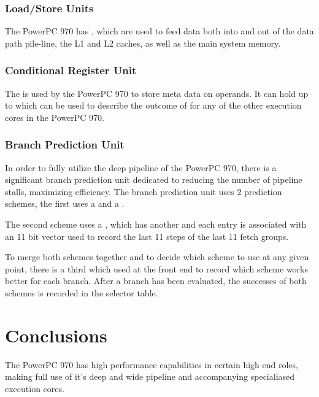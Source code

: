 \documentclass[a4paper,12pt]{article}
\begin{document}
\subsubsection{Load/Store Units}

The PowerPC 970 has \cite[dual load/store units for the entire CPU]{a1}, 
which are used to feed data both into and out of the data path pile-line, the L1 and 
L2 caches, as well as the main system memory.

\subsubsection{Conditional Register Unit}

The \cite[32 bit conditional register unit]{a6} is used by the PowerPC
970 to store meta data on \cite[integer and floating point]{a6} operands.
It can hold up to \cite[8 condition codes]{a6} which can be used to
describe the outcome of \cite[8 different instructions]{a6} for any of
the other execution cores in the PowerPC 970.

\subsubsection{Branch Prediction Unit}

In order to fully utilize the deep pipeline of the PowerPC 970, there is
a significant branch prediction unit dedicated to reducing the number of
pipeline stalls, maximizing efficiency. The branch prediction unit uses
2 prediction schemes, the first uses a \cite[16384 (16k) branch history 
table (BHT)]{a2} and a \cite[branch target buffer (BTB)]{a2}. 


The second scheme uses a \cite[global prediction table]{a2}, which has
another \cite[16k entry table]{a2} and each entry is associated with an
11 bit vector used to record the last 11 steps of the last 11 fetch
groups.

To merge both schemes together and to decide which scheme to use at any
given point, there is a third \cite[16k entry table, the selector table]{a2} 
which used at the front end to record which scheme works better for each 
branch. After a branch has been evaluated, the successes of both schemes
is recorded in the selector table.

\section{Conclusions}

The PowerPC 970 has high performance capabilities in certain high end
roles, making full use of it's deep and wide pipeline and accompanying
specialiased execution cores.
\end{document}
